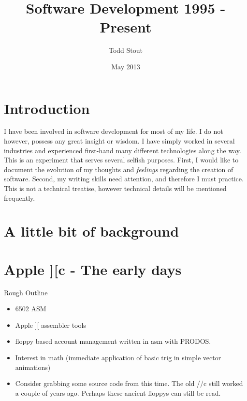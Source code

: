 \documentclass[12pt]{article}
\title{Software Development 1995 - Present}
\author{Todd Stout}
\date{May 2013}
\begin{document}
\maketitle

\section{Introduction}
I have been involved in software development for most of my life. I do not however, possess any great insight or wisdom. I have simply worked in several industries and experienced first-hand many different technologies along the way.
This is an experiment that serves several selfish purposes. First, I would like to document the evolution of my thoughts and \emph{feelings} regarding the creation of software. Second, my writing skills need attention, and therefore I must practice. This is not a technical treatise, however technical details will be mentioned frequently.

\pagebreak

%
%
\section{A little bit of background}
		
\section{Apple ][c - The early days}
	Rough Outline
	\begin{itemize}
	\item 6502 ASM
	\item Apple ][ assembler tools
	\item floppy based account management written in asm with PRODOS.
	\item Interest in math (immediate application of basic trig in simple vector animations)
	\item Consider grabbing some source code from this time. The old //c still worked a couple of years ago. Perhaps these ancient floppys can still be read.
	\end{itemize}
	
\end{document}
